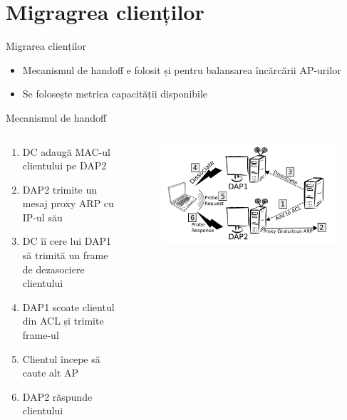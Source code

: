 \section{Migragrea clienților}

\begin{frame}{Migrarea clienților}
  \begin{itemize}
    \item Mecanismul de handoff e folosit și pentru balansarea încărcării AP-urilor
    \item Se folosește metrica capacității disponibile
  \end{itemize}
\end{frame}

\begin{frame}{Mecanismul de handoff}
  \begin{columns}
  \begin{column}{0.5\linewidth}
    \begin{enumerate}
      \item DC adaugă MAC-ul clientului pe DAP2
      \item DAP2 trimite un mesaj proxy ARP cu IP-ul său
      \item DC îi cere lui DAP1 să trimită un frame de dezasociere clientului
      \item DAP1 scoate clientul din ACL și trimite frame-ul
      \item Clientul începe să caute alt AP
      \item DAP2 răspunde clientului
    \end{enumerate}
  \end{column}
  \begin{column}{0.5\linewidth}
    \begin{figure}
      \includegraphics[scale=0.20]{img/fig3.png}
    \end{figure}
  \end{column}
  \end{columns}
\end{frame}

